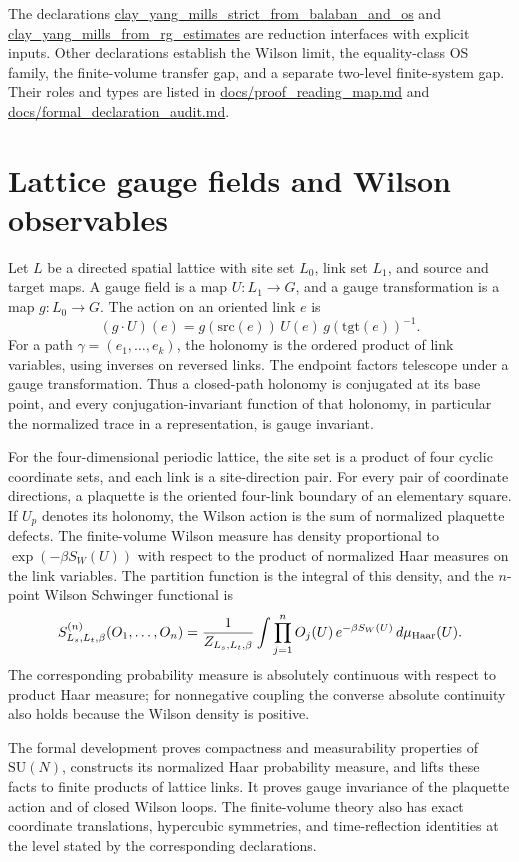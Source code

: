 \documentclass[11pt]{article}
\numberwithin{equation}{section}
\newcommand{\SU}{\mathrm{SU}}
\newcommand{\Sch}{S}
\newcommand{\Lean}[1]{\url{#1}}
\begin{document}
The declarations \Lean{clay_yang_mills_strict_from_balaban_and_os} and \Lean{clay_yang_mills_from_rg_estimates} are reduction interfaces with explicit inputs. Other declarations establish the Wilson limit, the equality-class OS family, the finite-volume transfer gap, and a separate two-level finite-system gap. Their roles and types are listed in \Lean{docs/proof_reading_map.md} and \Lean{docs/formal_declaration_audit.md}.

\section{Lattice gauge fields and Wilson observables}

Let \(L\) be a directed spatial lattice with site set \(L_0\), link set \(L_1\), and source and target maps. A gauge field is a map \(U:L_1\to G\), and a gauge transformation is a map \(g:L_0\to G\). The action on an oriented link \(e\) is
\[
  (g\cdot U)(e)=g(\mathrm{src}(e))\,U(e)\,g(\mathrm{tgt}(e))^{-1}.
\]
For a path \(\gamma=(e_1,\ldots,e_k)\), the holonomy is the ordered product of link variables, using inverses on reversed links. The endpoint factors telescope under a gauge transformation. Thus a closed-path holonomy is conjugated at its base point, and every conjugation-invariant function of that holonomy, in particular the normalized trace in a representation, is gauge invariant.

For the four-dimensional periodic lattice, the site set is a product of four cyclic coordinate sets, and each link is a site-direction pair. For every pair of coordinate directions, a plaquette is the oriented four-link boundary of an elementary square. If \(U_p\) denotes its holonomy, the Wilson action is the sum of normalized plaquette defects. The finite-volume Wilson measure has density proportional to \(\exp(-\beta S_W(U))\) with respect to the product of normalized Haar measures on the link variables. The partition function is the integral of this density, and the \(n\)-point Wilson Schwinger functional is
\[
  \Sch^{(n)}_{L_s,L_t,\beta}(O_1,\ldots,O_n)
  =\frac{1}{Z_{L_s,L_t,\beta}}
    \int \prod_{j=1}^{n}O_j(U)\,e^{-\beta S_W(U)}\,d\mu_{\rm Haar}(U).
\]
The corresponding probability measure is absolutely continuous with respect to product Haar measure; for nonnegative coupling the converse absolute continuity also holds because the Wilson density is positive.

The formal development proves compactness and measurability properties of \(\SU(N)\), constructs its normalized Haar probability measure, and lifts these facts to finite products of lattice links. It proves gauge invariance of the plaquette action and of closed Wilson loops. The finite-volume theory also has exact coordinate translations, hypercubic symmetries, and time-reflection identities at the level stated by the corresponding declarations.
\end{document}
